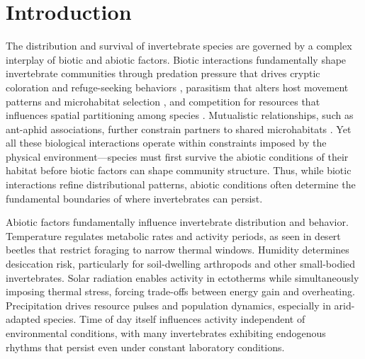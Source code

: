\usepackage{hyperref}
\usepackage{longtable}

\chapter{Introduction}
\label{ch:introduction}


The distribution and survival of invertebrate species are governed by a complex interplay of biotic and abiotic factors. Biotic interactions fundamentally shape invertebrate communities through predation pressure that drives cryptic coloration and refuge-seeking behaviors \citep{@blois-heulinDirectIndirectEffects1990; @holomuzkiBioticInteractionsFreshwater2010}, parasitism that alters host movement patterns and microhabitat selection \citep{@jollesSchistocephalusParasiteInfection2020; @laffertyComparingMechanismsHost2013; @poulinMetaanalysisParasiteinducedBehavioural1994}, and competition for resources that influences spatial partitioning among species \citep{@wertheimSpeciesDiversityMycophagous2000}. Mutualistic relationships, such as ant-aphid associations, further constrain partners to shared microhabitats \citep{@wayMutualismAntsHoneydewProducing1963; @yaoCostsConstraintsAphidant2014}.
Yet all these biological interactions operate within constraints imposed by the physical environment—species must first survive the abiotic conditions of their habitat before biotic factors can shape community structure. Thus, while biotic interactions refine distributional patterns, abiotic conditions often determine the fundamental boundaries of where invertebrates can persist.

Abiotic factors fundamentally influence invertebrate distribution and behavior. Temperature regulates metabolic rates and activity periods, as seen in desert beetles that restrict foraging to narrow thermal windows. Humidity determines desiccation risk, particularly for soil-dwelling arthropods and other small-bodied invertebrates. Solar radiation enables activity in ectotherms while simultaneously imposing thermal stress, forcing trade-offs between energy gain and overheating. Precipitation drives resource pulses and population dynamics, especially in arid-adapted species. Time of day itself influences activity independent of environmental conditions, with many invertebrates exhibiting endogenous rhythms that persist even under constant laboratory conditions.

